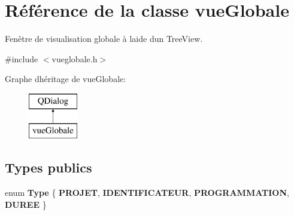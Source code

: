 \hypertarget{classvue_globale}{}\section{Référence de la classe vue\+Globale}
\label{classvue_globale}


Fenêtre de visualisation globale à l\textquotesingle{}aide d\textquotesingle{}un Tree\+View.  




{\ttfamily \#include $<$vueglobale.\+h$>$}

Graphe d\textquotesingle{}héritage de vue\+Globale\+:\begin{figure}[H]
\begin{center}
\leavevmode
\includegraphics[height=2.000000cm]{classvue_globale}
\end{center}
\end{figure}
\subsection*{Types publics}
\begin{DoxyCompactItemize}
\item 
\hypertarget{classvue_globale_af10a90ecd40a8aead21f78a2cdb0d39a}{}enum {\bfseries Type} \{ {\bfseries P\+R\+O\+J\+E\+T}, 
{\bfseries I\+D\+E\+N\+T\+I\+F\+I\+C\+A\+T\+E\+U\+R}, 
{\bfseries P\+R\+O\+G\+R\+A\+M\+M\+A\+T\+I\+O\+N}, 
{\bfseries D\+U\+R\+E\+E}
 \}\label{classvue_globale_af10a90ecd40a8aead21f78a2cdb0d39a}

\end{DoxyCompactItemize}
